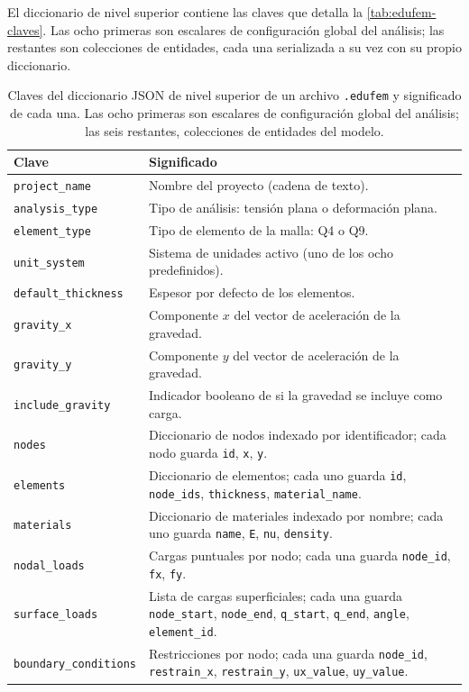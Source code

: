 El diccionario de nivel superior contiene las claves que detalla la \autoref{tab:edufem-claves}. Las ocho primeras son escalares de configuración global del análisis; las restantes son colecciones de entidades, cada una serializada a su vez con su propio diccionario.

\begin{table}[htbp]
\centering
\caption[Claves del diccionario JSON de un proyecto \texttt{.edufem}.]{Claves del diccionario JSON de nivel superior de un archivo \texttt{.edufem} y significado de cada una. Las ocho primeras son escalares de configuración global del análisis; las seis restantes, colecciones de entidades del modelo.}
\label{tab:edufem-claves}
\begin{tabular}{l p{9.2cm}}
\toprule
\textbf{Clave} & \textbf{Significado} \\
\midrule
\texttt{project\_name}       & Nombre del proyecto (cadena de texto). \\
\texttt{analysis\_type}      & Tipo de análisis: tensión plana o deformación plana. \\
\texttt{element\_type}       & Tipo de elemento de la malla: Q4 o Q9. \\
\texttt{unit\_system}        & Sistema de unidades activo (uno de los ocho predefinidos). \\
\texttt{default\_thickness}  & Espesor por defecto de los elementos. \\
\texttt{gravity\_x}          & Componente $x$ del vector de aceleración de la gravedad. \\
\texttt{gravity\_y}          & Componente $y$ del vector de aceleración de la gravedad. \\
\texttt{include\_gravity}    & Indicador booleano de si la gravedad se incluye como carga. \\
\texttt{nodes}               & Diccionario de nodos indexado por identificador; cada nodo guarda \texttt{id}, \texttt{x}, \texttt{y}. \\
\texttt{elements}            & Diccionario de elementos; cada uno guarda \texttt{id}, \texttt{node\_ids}, \texttt{thickness}, \texttt{material\_name}. \\
\texttt{materials}           & Diccionario de materiales indexado por nombre; cada uno guarda \texttt{name}, \texttt{E}, \texttt{nu}, \texttt{density}. \\
\texttt{nodal\_loads}        & Cargas puntuales por nodo; cada una guarda \texttt{node\_id}, \texttt{fx}, \texttt{fy}. \\
\texttt{surface\_loads}      & Lista de cargas superficiales; cada una guarda \texttt{node\_start}, \texttt{node\_end}, \texttt{q\_start}, \texttt{q\_end}, \texttt{angle}, \texttt{element\_id}. \\
\texttt{boundary\_conditions} & Restricciones por nodo; cada una guarda \texttt{node\_id}, \texttt{restrain\_x}, \texttt{restrain\_y}, \texttt{ux\_value}, \texttt{uy\_value}. \\
\bottomrule
\end{tabular}
\end{table}

